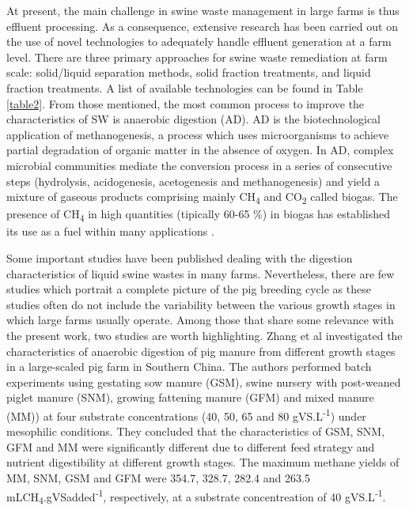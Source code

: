 At present, the main challenge in swine waste management in large farms is thus effluent processing. As a consequence, extensive research has been carried out on the use of novel technologies to adequately handle effluent generation at a farm level. There are three primary approaches for swine waste remediation at farm scale: solid/liquid separation methods, solid fraction treatments, and liquid fraction treatments. A list of available technologies can be found in Table \ref{table2}. From those mentioned, the most common process to improve the characteristics of SW is anaerobic digestion (AD). AD is the biotechnological application of methanogenesis, a process which uses microorganisms to achieve partial degradation of organic matter in the absence of oxygen. In AD, complex microbial communities mediate the conversion process in a series of consecutive steps (hydrolysis, acidogenesis, acetogenesis and methanogenesis) and yield a mixture of gaseous products comprising mainly CH\textsubscript{4} and CO\textsubscript{2} called biogas. The presence of CH\textsubscript{4} in high quantities (tipically 60-65 \%) in biogas has established its use as a fuel within many applications \cite{Mata_Alvarez_2014,O_Flaherty_2010}.

Some important studies have been published dealing with the digestion characteristics of liquid swine wastes in many farms. Nevertheless, there are few studies which portrait a complete picture of the pig breeding cycle as these studies often do not include the variability between the various growth stages in which large farms usually operate. Among those that share some relevance with the present work, two studies are worth highlighting. Zhang et al \cite{Zhang_2014} investigated the characteristics of anaerobic digestion of pig manure from different growth stages in a large-scaled pig farm in Southern China. The authors performed batch experiments using gestating sow manure (GSM), swine nursery with post-weaned piglet manure (SNM), growing fattening manure (GFM) and mixed manure (MM))  at four substrate concentrations (40, 50, 65 and 80 gVS.L\textsuperscript{-1}) under mesophilic conditions. They concluded that the characteristics of GSM, SNM, GFM and MM were significantly different due to different feed strategy and nutrient digestibility at different growth stages. The maximum methane yields of MM, SNM, GSM and GFM were 354.7, 328.7, 282.4 and 263.5 mLCH\textsubscript{4}.gVSadded\textsuperscript{-1}, respectively, at a substrate concentreation of 40 gVS.L\textsuperscript{-1}. 